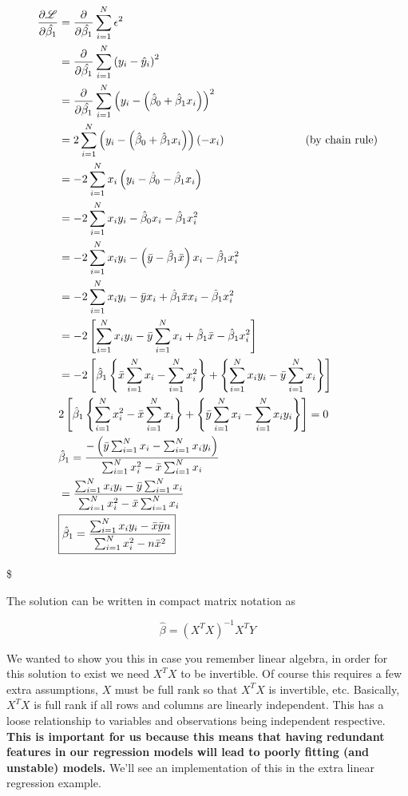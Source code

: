 \documentclass[11pt]{article}
\begin{document}
\begin{align}
\frac{\partial \mathscr{L}}{\partial \hat{\beta_1}} &= \frac{\partial}{\partial \hat{\beta_1}} \sum_{i=1}^N \epsilon^2 \\
&= \frac{\partial}{\partial \hat{\beta_1}} \sum_{i=1}^N \left( y_i - \hat{y}_i \right)^2 \\
&= \frac{\partial}{\partial \hat{\beta_1}} \sum_{i=1}^N \left( y_i - \left( \hat{\beta}_0 + \hat{\beta}_1 x_i \right) \right)^2 \\
&= 2 \sum_{i=1}^N \left( y_i - \left( \hat{\beta}_0 + \hat{\beta}_1 x_i \right) \right) \left( -x_i \right) \hspace{25mm}\mbox{(by chain rule)} \\
&= -2 \sum_{i=1}^N x_i \left( y_i - \hat{\beta}_0 - \hat{\beta}_1 x_i \right) \\
&= -2 \sum_{i=1}^N x_i y_i - \hat{\beta}_0 x_i - \hat{\beta}_1 x_i^2 \\
&= -2 \sum_{i=1}^N x_i y_i - \left( \bar{y} - \hat{\beta}_1 \bar{x} \right) x_i - \hat{\beta}_1 x_i^2 \\
&= -2 \sum_{i=1}^N x_i y_i - \bar{y}x_i + \hat{\beta}_1\bar{x}x_i - \hat{\beta}_1 x_i^2 \\
&= -2 \left[ \sum_{i=1}^N x_i y_i - \bar{y} \sum_{i=1}^N x_i + \hat{\beta}_1\bar{x} - \hat{\beta}_1 x_i^2 \right] \\
&= -2 \left[ \hat{\beta}_1 \left\{ \bar{x} \sum_{i=1}^N x_i - \sum_{i=1}^N x_i^2 \right\} + \left\{ \sum_{i=1}^N x_i y_i - \bar{y} \sum_{i=1}^N x_i \right\}\right] \\
& 2 \left[ \hat{\beta}_1 \left\{ \sum_{i=1}^N x_i^2 - \bar{x} \sum_{i=1}^N x_i \right\} + \left\{ \bar{y} \sum_{i=1}^N x_i - \sum_{i=1}^N x_i y_i \right\} \right] = 0 \\
& \hat{\beta}_1 = \frac{-\left( \bar{y} \sum_{i=1}^N x_i - \sum_{i=1}^N x_i y_i \right)}{\sum_{i=1}^N x_i^2 - \bar{x}\sum_{i=1}^N x_i} \\
&= \frac{\sum_{i=1}^N x_i y_i - \bar{y} \sum_{i=1}^N x_i}{\sum_{i=1}^N x_i^2 - \bar{x} \sum_{i=1}^N x_i} \\
& \boxed{\hat{\beta}_1 = \frac{\sum_{i=1}^N x_i y_i - \bar{x}\bar{y}n}{\sum_{i=1}^N x_i^2 - n \bar{x}^2}}
\end{align}

\$

    The solution can be written in compact matrix notation as

\[\hat\beta =  (X^T X)^{-1}X^T Y\]

We wanted to show you this in case you remember linear algebra, in order
for this solution to exist we need \(X^T X\) to be invertible. Of course
this requires a few extra assumptions, \(X\) must be full rank so that
\(X^T X\) is invertible, etc. Basically, \(X^T X\) is full rank if all
rows and columns are linearly independent. This has a loose relationship
to variables and observations being independent respective. \textbf{This
is important for us because this means that having redundant features in
our regression models will lead to poorly fitting (and unstable)
models.} We'll see an implementation of this in the extra linear
regression example.
\end{document}
